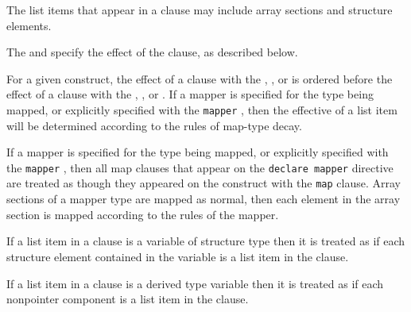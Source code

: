 \descr
The list items that appear in a  clause may include array sections and structure elements.

The  and  specify the effect of the  clause, as described below.

For a given construct, the effect of a  clause with the ,
, or   is ordered before the effect of a
 clause with the , , or 
. If a mapper is specified for the type being mapped, or
explicitly specified with the \verb`mapper` , then the
effective  of a list item will be determined according to the
rules of map-type decay.

If a mapper is specified for the type being mapped, or explicitly specified with
the \verb`mapper` , then all map clauses that appear on the
\verb`declare mapper` directive are treated as though they appeared on the
construct with the \verb`map` clause.  Array sections of a mapper type are
mapped as normal, then each element in the array section is mapped according to
the rules of the mapper.

\begin{ccppspecific}
If a list item in a  clause is a variable of structure type then it
is treated as if each structure element contained in the variable is a list
item in the clause.
\end{ccppspecific}

\begin{fortranspecific}
If a list item in a  clause is a derived type variable
then it is treated as if each nonpointer component is a list item in
the clause.
\end{fortranspecific}

